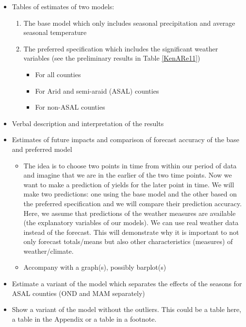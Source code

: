 \documentclass[a4paper,12pt]{article}
\begin{document}
\color{blue}
\begin{itemize}

\item Tables of estimates of two models:

\begin{enumerate}
\item The base model which only includes seasonal precipitation and average seasonal temperature
\item The preferred specification which includes the significant weather variables (see the preliminary results in Table \ref{KenARe11}) 

\begin{itemize}
\item For all counties 
\item For Arid and semi-araid (ASAL) counties
\item For non-ASAL counties
\end{itemize}

\end{enumerate}
\item Verbal description and interpretation of the results
\item Estimates of future impacts and comparison of forecast accuracy of the base and preferred model

\begin{itemize}

\item The idea is to choose two points in time from within our period of data and imagine that we are in the earlier of the two time points. Now we want to make a prediction of yields for the later point in time. We will make two predictions: one using the base model and the other based on the preferred specification and we will compare their prediction accuracy. Here, we assume that predictions of the weather measures are available (the explanatory variables of our models). We can use real weather data instead of the forecast. This will demonstrate why it is important to not only forecast totals/means but also other characteristics (measures) of weather/climate.
		\item Accompany with a graph(s), possibly barplot(s)
\end{itemize}

\item Estimate a variant of the model which separates the effects of the seasons for ASAL counties (OND and MAM separately)

\item Show a variant of the model without the outliers. This could be a table here, a table in the Appendix or a table in a footnote. 


\end{itemize}
\end{document}
